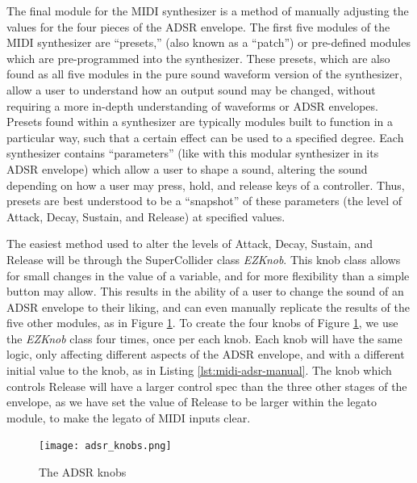 The final module for the MIDI synthesizer is a method of manually adjusting the values for the four pieces of the ADSR envelope. The first five modules of the MIDI synthesizer are ``presets,'' (also known as a ``patch'') or pre-defined modules which are pre-programmed into the synthesizer. These presets, which are also found as all five modules in the pure sound waveform version of the synthesizer, allow a user to understand how an output sound may be changed, without requiring a more in-depth understanding of waveforms or ADSR envelopes. Presets found within a synthesizer are typically modules built to function in a particular way, such that a certain effect can be used to a specified degree. Each synthesizer contains ``parameters'' (like with this modular synthesizer in its ADSR envelope) which allow a user to shape a sound, altering the sound depending on how a user may press, hold, and release keys of a controller. Thus, presets are best understood to be a ``snapshot'' of these parameters (the level of Attack, Decay, Sustain, and Release) at specified values.

The easiest method used to alter the levels of Attack, Decay, Sustain, and Release will be through the SuperCollider class \textit{EZKnob}. This knob class allows for small changes in the value of a variable, and for more flexibility than a simple button may allow. This results in the ability of a user to change the sound of an ADSR envelope to their liking, and can even manually replicate the results of the five other modules, as in Figure \ref{fig:adsr-knobs}. To create the four knobs of Figure \ref{fig:adsr-knobs}, we use the \textit{EZKnob} class four times, once per each knob. Each knob will have the same logic, only affecting different aspects of the ADSR envelope, and with a different initial value to the knob, as in Listing \ref{lst:midi-adsr-manual}. The knob which controls Release will have a larger control spec than the three other stages of the envelope, as we have set the value of Release to be larger within the legato module, to make the legato of MIDI inputs clear.

\begin{figure}[h]
  \centering
  \texttt{[image: adsr\_knobs.png]}
  \caption{The ADSR knobs}
  \label{fig:adsr-knobs}
\end{figure}



